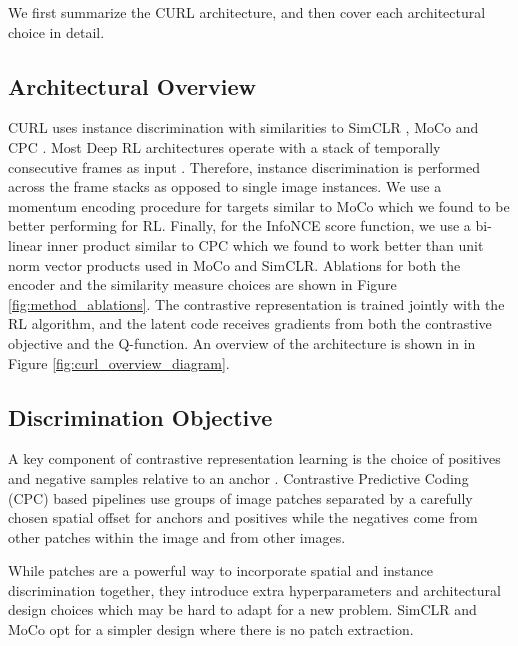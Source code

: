 We first summarize the CURL architecture, and then cover each architectural choice in detail.

\subsection{Architectural Overview}

CURL uses instance discrimination with similarities to SimCLR \cite{chen2020simclr}, MoCo \cite{he2019momentum} and CPC \cite{henaff2019data}. Most Deep RL architectures operate with a stack of temporally consecutive frames as input \cite{hessel2017rainbow}. Therefore, instance discrimination is performed across the frame stacks as opposed to single image instances. We use a momentum encoding procedure for targets similar to MoCo \cite{kaiming2019moco} which we found to be better performing for RL. Finally, for the InfoNCE score function, we use a bi-linear inner product similar to CPC \cite{oord2018representation} which we found to work better than unit norm vector products used in MoCo and SimCLR. Ablations for both the encoder and the similarity measure choices are shown in Figure \ref{fig:method_ablations}. The contrastive representation is trained jointly with the RL algorithm, and the latent code receives gradients from both the contrastive objective and the Q-function. An overview of the architecture is shown in in Figure \ref{fig:curl_overview_diagram}.


\subsection{Discrimination Objective}
A key component of contrastive representation learning is the choice of positives and negative samples relative to an anchor \cite{bachman2019learning, tian2019contrastive, henaff2019data, he2019momentum, chen2020simclr}. Contrastive Predictive Coding (CPC) based pipelines \cite{henaff2019data, oord2018representation} use groups of image patches separated by a carefully chosen spatial offset for anchors and positives while the negatives come from other patches within the image and from other images. 

While patches are a powerful way to incorporate spatial and instance discrimination together, they introduce extra hyperparameters and architectural design choices which may be hard to adapt for a new problem. SimCLR \cite{chen2020simclr} and MoCo \cite{he2019momentum} opt for a simpler design where there is no patch extraction. 

